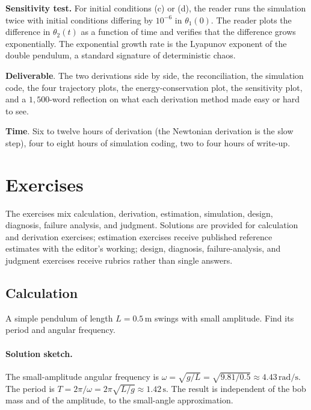 \begin{project}
\textbf{Sensitivity test.} For initial conditions (c) or (d), the
reader runs the simulation twice with initial conditions differing
by $10^{-6}$ in $\theta_1(0)$. The reader plots the difference in
$\theta_2(t)$ as a function of time and verifies that the difference
grows exponentially. The exponential growth rate is the Lyapunov
exponent of the double pendulum, a standard signature of
deterministic chaos.

\textbf{Deliverable}. The two derivations side by side, the
reconciliation, the simulation code, the four trajectory plots, the
energy-conservation plot, the sensitivity plot, and a $1{,}500$-word
reflection on what each derivation method made easy or hard to see.

\textbf{Time}. Six to twelve hours of derivation (the Newtonian
derivation is the slow step), four to eight hours of simulation
coding, two to four hours of write-up.
\end{project}

\section{Exercises}

The exercises mix calculation, derivation, estimation, simulation,
design, diagnosis, failure analysis, and judgment. Solutions are
provided for calculation and derivation exercises; estimation
exercises receive published reference estimates with the editor's
working; design, diagnosis, failure-analysis, and judgment exercises
receive rubrics rather than single answers.

\subsection*{Calculation}

\begin{exercise}
A simple pendulum of length $L = 0.5\,\si{\meter}$ swings with small
amplitude. Find its period and angular frequency.

\paragraph{Solution sketch.} The small-amplitude angular frequency is
$\omega = \sqrt{g/L} = \sqrt{9.81/0.5} \approx 4.43\,\si{\radian\per
\second}$. The period is $T = 2\pi/\omega = 2\pi\sqrt{L/g} \approx
1.42\,\si{\second}$. The result is independent of the bob mass and of
the amplitude, to the small-angle approximation.
\end{exercise}

